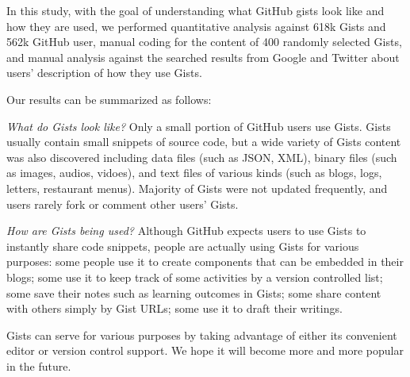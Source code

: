 In this study, with the goal of understanding what GitHub gists look like and how they are used, we performed quantitative analysis against 618k Gists and 562k GitHub user, manual coding for the content of 400 randomly selected Gists, and manual analysis against the searched results from Google and Twitter about users' description of how they use Gists. 

Our results can be summarized as follows:

\textsl{What do Gists look like?} Only a small portion of GitHub users use Gists. Gists usually contain small snippets of source code, but a wide variety of Gists content was also discovered including data files (such as JSON, XML), binary files (such as images, audios, vidoes), and text files of various kinds (such as blogs, logs, letters, restaurant menus). Majority of Gists were not updated frequently, and users rarely fork or comment other users' Gists.

\textsl{How are Gists being used?} Although GitHub expects users to use Gists to instantly share code snippets, people are actually using Gists for various purposes: some people use it to create components that can be embedded in their blogs; some use it to keep track of some activities by a version controlled list; some save their notes such as learning outcomes in Gists; some share content with others simply by Gist URLs; some use it to draft their writings.

Gists can serve for various purposes by taking advantage of either its convenient editor or version control support. We hope it will become more and more popular in the future.